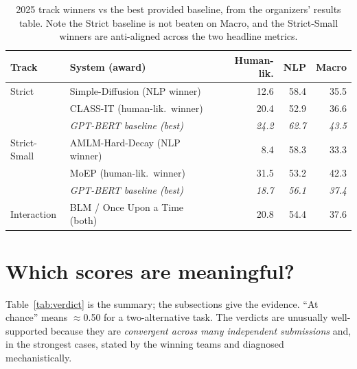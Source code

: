 \documentclass[11pt]{article}
\begin{document}
\begin{table}[h]
\centering\small
\renewcommand{\arraystretch}{1.2}
\begin{tabular}{@{}l l r r r@{}}
\toprule
\textbf{Track} & \textbf{System (award)} & \textbf{Human-lik.} & \textbf{NLP} & \textbf{Macro}\\
\midrule
Strict & Simple-Diffusion (NLP winner) & 12.6 & 58.4 & 35.5\\
       & CLASS-IT (human-lik.\ winner) & 20.4 & 52.9 & 36.6\\
       & \emph{GPT-BERT baseline (best)} & \emph{24.2} & \emph{62.7} & \emph{43.5}\\
\midrule
Strict-Small & AMLM-Hard-Decay (NLP winner) & 8.4 & 58.3 & 33.3\\
             & MoEP (human-lik.\ winner) & 31.5 & 53.2 & 42.3\\
             & \emph{GPT-BERT baseline (best)} & \emph{18.7} & \emph{56.1} & \emph{37.4}\\
\midrule
Interaction & BLM / Once Upon a Time (both) & 20.8 & 54.4 & 37.6\\
\bottomrule
\end{tabular}
\caption{2025 track winners vs the best provided baseline, from the organizers' results table.
Note the Strict baseline is not beaten on Macro, and the Strict-Small winners are
anti-aligned across the two headline metrics.}
\label{tab:winners}
\end{table}

\section{Which scores are meaningful?}
\label{sec:meaningful}
Table~\ref{tab:verdict} is the summary; the subsections give the evidence. ``At chance'' means
$\approx$0.50 for a two-alternative task. The verdicts are unusually well-supported because they
are \emph{convergent across many independent submissions} and, in the strongest cases, stated by
the winning teams and diagnosed mechanistically.
\end{document}
